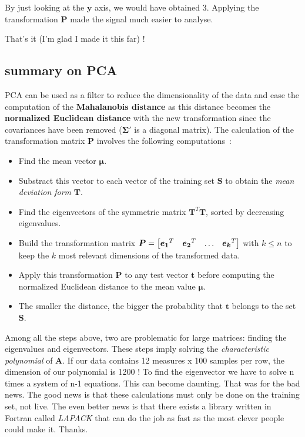 \documentclass[11pt,twocolumn]{amsart} %
\newcommand{\ve}[1]{\boldsymbol{#1}}
\newcommand{\ma}[1]{\boldsymbol{#1}}
\newenvironment{m}{\begin{bmatrix}}{\end{bmatrix}}
\begin{document}
By just looking at the $\ve{y}$ axis, we would have obtained $3$. Applying the transformation $\ma{P}$ made the signal much easier to analyse.

That's it (I'm glad I made it this far) !

\subsection{summary on PCA}

PCA can be used as a filter to reduce the dimensionality of the data and ease the computation of the \textbf{Mahalanobis distance} as this distance becomes the \textbf{normalized Euclidean distance} with the new transformation since the covariances have been removed ($\ma\Sigma'$ is a diagonal matrix). The calculation of the transformation matrix $\ma{P}$ involves the following computations~:
\begin{itemize}
  \item Find the mean vector $\ve\mu$.
  \item Substract this vector to each vector of the training set $\ma{S}$ to obtain the \emph{mean deviation form} $\ma{T}$.
  \item Find the eigenvectors of the symmetric matrix $\ma{T}^T\ma{T}$, sorted by decreasing eigenvalues.
  \item Build the transformation matrix $\ma{P} = \begin{m}\ve{e_1}^T & \ve{e_2}^T & \hdots & \ve{e_k}^T \end{m}$ with $k \leq n$ to keep the $k$ most relevant dimensions of the transformed data.
  \item Apply this transformation $\ma{P}$ to any test vector $\ve{t}$ before computing the normalized Euclidean distance to the mean value $\ve\mu$.
  \item The smaller the distance, the bigger the probability that $\ve{t}$ belongs to the set $\ma{S}$.
\end{itemize}

Among all the steps above, two are problematic for large matrices: finding the eigenvalues and eigenvectors. These steps imply solving the \emph{characteristic polynomial} of $\ma{A}$. If our data contains 12 measures x 100 samples per row, the dimension of our polynomial is 1200 ! To find the eigenvector we have to solve n times a system of n-1 equations. This can become daunting. That was for the bad news. The good news is that these calculations must only be done on the training set, not live. The even better news is that there exists a library written in Fortran called \emph{LAPACK} that can do the job as fast as the most clever people could make it. Thanks.
\end{document}
